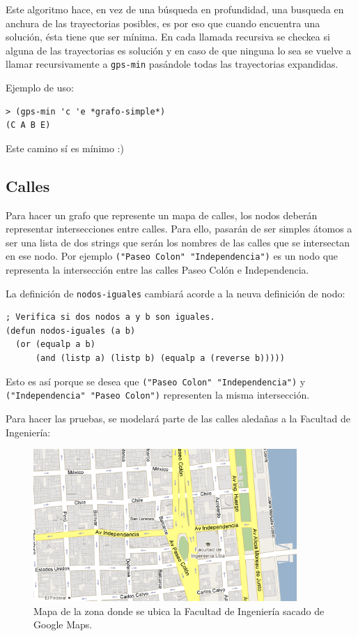 \documentclass[12pt,titlepage]{article}
\begin{document}
Este algoritmo hace, en vez de una búsqueda en profundidad, una busqueda en anchura de las trayectorias posibles, es por eso que cuando encuentra una solución, ésta tiene que ser mínima. En cada llamada recursiva se checkea si alguna de las trayectorias es solución y en caso de que ninguna lo sea se vuelve a llamar recursivamente a \lstinline|gps-min| pasándole todas las trayectorias expandidas.

Ejemplo de uso:
\begin{lstlisting}
> (gps-min 'c 'e *grafo-simple*)
(C A B E)
\end{lstlisting}

Este camino sí es mínimo :)

\subsection{Calles}

Para hacer un grafo que represente un mapa de calles, los nodos deberán representar intersecciones entre calles. Para ello, pasarán de ser simples átomos a ser una lista de dos strings que serán los nombres de las calles que se intersectan en ese nodo. Por ejemplo \lstinline|("Paseo Colon" "Independencia")| es un nodo que representa la intersección entre las calles Paseo Colón e Independencia.

La definición de \lstinline|nodos-iguales| cambiará acorde a la neuva definición de nodo:
\begin{lstlisting}
; Verifica si dos nodos a y b son iguales.
(defun nodos-iguales (a b)
  (or (equalp a b) 
      (and (listp a) (listp b) (equalp a (reverse b)))))
\end{lstlisting}

Esto es así porque se desea que \lstinline|("Paseo Colon" "Independencia")| y \lstinline|("Independencia" "Paseo Colon")| representen la misma intersección.

Para hacer las pruebas, se modelará parte de las calles aledañas a la Facultad de Ingeniería:
\begin{figure}[H]
\begin{center}
\includegraphics[width=10cm]{mapa.png}
\caption{Mapa de la zona donde se ubica la Facultad de Ingeniería sacado de Google Maps.}
\end{center}
\end{figure}
\end{document}
